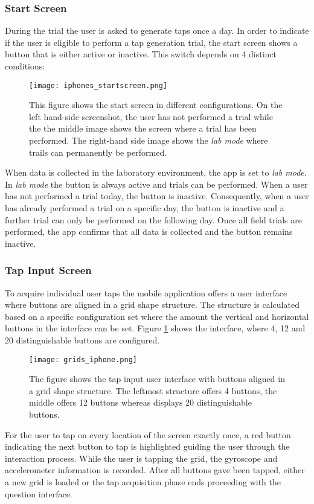 \subsubsection{Start Screen}
During the trial the user is asked to generate taps once a day. In order to indicate if the user is eligible to perform a tap generation trial, the start screen shows a button that is either active or inactive. This switch depends on 4 distinct conditions:
\begin{figure}[h!]
  \centering
  \texttt{[image: iphones\_startscreen.png]}
  \caption{This figure shows the start screen in different configurations. On the left hand-side screenshot, the user has not performed a trial while the the middle image shows the screen where a trial has been performed. The right-hand side image shows the \textit{lab mode} where trails can permanently be performed.}
\end{figure}
When data is collected in the laboratory environment, the app is set to \textit{lab mode}. In \textit{lab mode} the button is always active and trials can be performed. When a user has not performed a trial today, the button is inactive. Consequently, when a user has already performed a trial on a specific day, the button is inactive and a further trial can only be performed on the following day. Once all field trials are performed, the app confirms that all data is collected and the button remains inactive.
\subsubsection{Tap Input Screen}
To acquire individual user taps the mobile application offers a user interface where buttons are aligned in a grid shape structure. The structure is calculated based on a specific configuration set where the amount the vertical and horizontal buttons in the interface can be set. Figure \ref{fig:grid} shows the interface, where 4, 12 and 20 distinguishable buttons are configured.
\begin{figure}[h!]
  \centering
  \texttt{[image: grids\_iphone.png]}
  \caption{The figure shows the tap input user interface with buttons aligned in a grid shape structure. The leftmost structure offers 4 buttons, the middle offers 12 buttons whereas displays 20 distinguishable buttons.}\label{fig:grid}
\end{figure}
For the user to tap on every location of the screen exactly once, a red button indicating the next button to tap is highlighted guiding the user through the interaction process. While the user is tapping the grid, the gyroscope and accelerometer information is recorded. After all buttons gave been tapped, either a new grid is loaded or the tap acquisition phase ends proceeding with the question interface.


